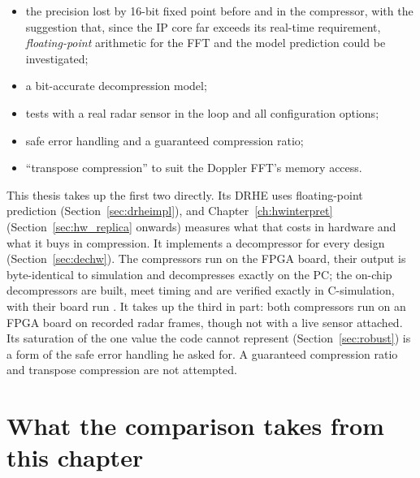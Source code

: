 \begin{itemize}
\item the precision lost by 16-bit fixed point before and in the compressor,
with the suggestion that, since the IP core far exceeds its real-time
requirement, \emph{floating-point} arithmetic for the FFT and the model
prediction could be investigated;
\item a bit-accurate decompression model;
\item tests with a real radar sensor in the loop and all configuration options;
\item safe error handling and a guaranteed compression ratio;
\item ``transpose compression'' to suit the Doppler FFT's memory access.
\end{itemize}

\noindent
This thesis takes up the first two directly. Its DRHE uses floating-point
prediction (Section~\ref{sec:drheimpl}), and Chapter~\ref{ch:hwinterpret}
(Section~\ref{sec:hw_replica} onwards) measures what that costs in hardware and
what it buys in compression. It implements a decompressor for every design
(Section~\ref{sec:dechw}). The compressors run on the FPGA board, their output
is byte-identical to simulation and decompresses exactly on the PC; the
on-chip decompressors are built, meet timing and are verified exactly in
C-simulation, with their board run . It takes up the
third in part: both compressors run on an FPGA board
on recorded radar frames, though not with a live sensor attached. Its saturation
of the one value the code cannot represent (Section~\ref{sec:robust}) is a
form of the safe error handling he asked for. A guaranteed compression ratio
and transpose compression are not attempted.

\section{What the comparison takes from this chapter}
\label{sec:kc_takeaway}

